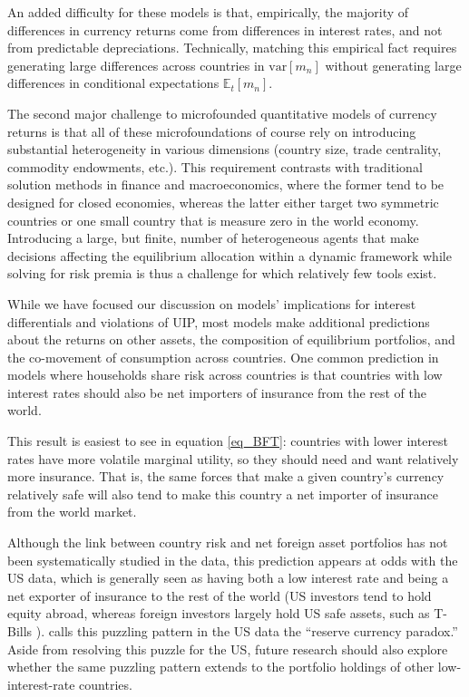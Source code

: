 \documentclass[11pt]{article}
\begin{document}
An added difficulty for these models is that, empirically, the majority of differences in currency returns come from differences in interest rates, and not from predictable depreciations. Technically, matching this empirical fact requires generating large differences across countries in $\text{var}\left[ m_n \right]$ without generating large differences in conditional expectations $\mathbb{E}_t\left[ m_n \right]$. 

The second major challenge to microfounded quantitative models of currency returns is that all of these microfoundations of course rely on introducing substantial heterogeneity in various dimensions (country size, trade centrality, commodity endowments, etc.). This requirement contrasts with traditional solution methods in finance and macroeconomics, where the former tend to be designed for closed economies, whereas the latter either target two symmetric countries or one small country that is measure zero in the world economy. Introducing a large, but finite, number of heterogeneous agents that make decisions affecting the equilibrium allocation within a dynamic framework while solving for risk premia is thus a challenge for which relatively few tools exist. 

\begin{tcolorbox}[sharp corners, title = Foreign Asset Portfolios and the Reserve Currency Paradox]
While we have focused our discussion on models' implications for interest differentials and violations of UIP, most models make additional predictions about the returns on other assets, the composition of equilibrium portfolios, and the co-movement of consumption across countries. One common prediction in models where households share risk across countries is that countries with low interest rates should also be net importers of insurance from the rest of the world. 

\quad This result is easiest to see in equation \ref{eq_BFT}: countries with lower interest rates have more volatile marginal utility, so they should need and want relatively more insurance. That is, the same forces that make a given country's currency relatively safe will also tend to make this country a net importer of insurance from the world market. 

\quad Although the link between country risk and net foreign asset portfolios has not been systematically studied in the data, this prediction appears at odds with the US data, which is generally seen as having both a low interest rate and being a net exporter of insurance to the rest of the world (US investors tend to hold equity abroad, whereas foreign investors largely hold US safe assets, such as T-Bills \citep{GourinchasRey2007,GourinchasGovillotRey2017}). \cite{Maggiori2013} calls this puzzling pattern in the US data the ``reserve currency paradox.'' Aside from resolving this puzzle for the US, future research should also explore whether the same puzzling pattern extends to the portfolio holdings of other low-interest-rate countries. 
\end{tcolorbox}
\end{document}
